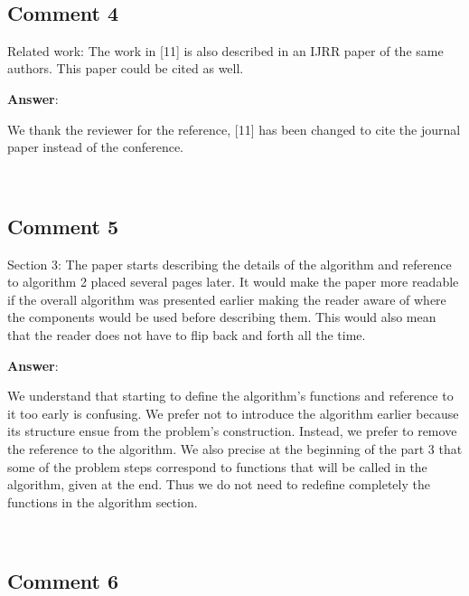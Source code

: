 \documentclass{scrartcl}
\begin{document}
\noindent
\hrulefill\\

\subsection{Comment 4}

Related work: 
The work in [11] is also described in an IJRR paper of the same authors. This paper could be cited as well.

\vspace{0.5cm}

\textbf{Answer}:

We thank the reviewer for the reference, [11] has been changed to cite the journal paper instead of the conference.

\noindent
\hrulefill\\

\subsection{Comment 5}

Section 3:
The paper starts describing the details of the algorithm and reference to algorithm 2 placed several pages later. It would make the paper more readable if the overall algorithm was presented earlier making the reader aware of where the components would be used before describing them. This would also mean that the reader does not have to flip back and forth all the time.

\vspace{0.5cm}

\textbf{Answer}:

We understand that starting to define the algorithm's functions and reference 
to it too early is confusing.
We prefer not to introduce the algorithm earlier because its structure ensue 
from the problem's construction.
Instead, we prefer to remove the reference to the algorithm. We also precise at 
the beginning of the part 3 that some of the problem steps correspond to 
functions that will be called in the algorithm, given at the end. Thus we do not need to redefine completely the functions in the algorithm section.

\noindent
\hrulefill\\

\subsection{Comment 6}
\end{document}
